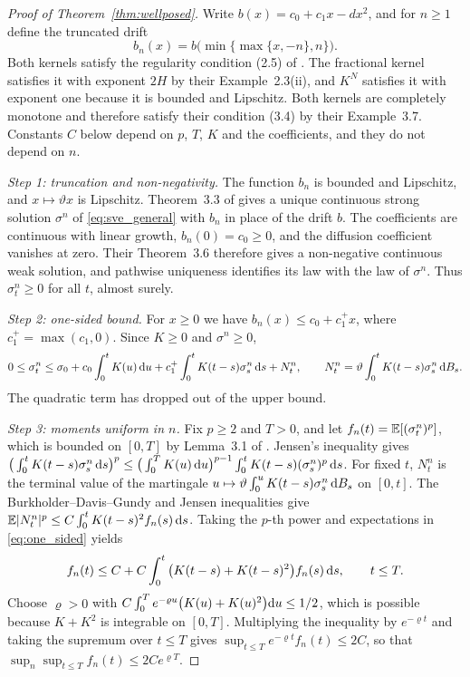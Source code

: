 \begin{proof}[Proof of Theorem~\ref{thm:wellposed}] Write $b(x)=c_0+c_1x-dx^2$, and for $n\ge1$ define the truncated drift
\begin{equation*}
b_n(x)=b\big(\min\{\max\{x,-n\},n\}\big).
\end{equation*}
Both kernels satisfy the regularity condition (2.5) of \citet{AbiJaberLarssonPulido2019}. The fractional kernel satisfies it with exponent $2H$ by their Example~2.3(ii), and $K^N$ satisfies it with exponent one because it is bounded and Lipschitz. Both kernels are completely monotone and therefore satisfy their condition (3.4) by their Example~3.7. Constants $C$ below depend on $p$, $T$, $K$ and the coefficients, and they do not depend on $n$.

\emph{Step 1: truncation and non-negativity.} The function $b_n$ is bounded and Lipschitz, and $x\mapsto\vartheta x$ is Lipschitz. Theorem~3.3 of \citet{AbiJaberLarssonPulido2019} gives a unique continuous strong solution $\sigma^n$ of \eqref{eq:sve_general} with $b_n$ in place of the drift $b$. The coefficients are continuous with linear growth, $b_n(0)=c_0\ge0$, and the diffusion coefficient vanishes at zero. Their Theorem~3.6 therefore gives a non-negative continuous weak solution, and pathwise uniqueness identifies its law with the law of $\sigma^n$. Thus $\sigma^n_t\ge0$ for all $t$, almost surely.

\emph{Step 2: one-sided bound.} For $x\ge0$ we have $b_n(x)\le c_0+c_1^+x$, where $c_1^+=\max(c_1,0)$. Since $K\ge0$ and $\sigma^n\ge0$,
\begin{equation}\label{eq:one_sided}
0\le\sigma^n_t\le\sigma_0+c_0\int_0^tK(u)\,\D u+c_1^+\int_0^tK(t-s)\sigma^n_s\,\D s+N^n_t,\qquad N^n_t=\vartheta\int_0^tK(t-s)\sigma^n_s\,\D B_s .
\end{equation}
The quadratic term has dropped out of the upper bound.

\emph{Step 3: moments uniform in $n$.} Fix $p\ge2$ and $T>0$, and let $f_n(t)=\mathbb{E}[(\sigma^n_t)^p]$, which is bounded on $[0,T]$ by Lemma~3.1 of \citet{AbiJaberLarssonPulido2019}. Jensen's inequality gives $\big(\int_0^tK(t-s)\sigma^n_s\,\mathrm{d} s\big)^p\le\big(\int_0^TK(u)\,\mathrm{d} u\big)^{p-1}\int_0^tK(t-s)(\sigma^n_s)^p\,\mathrm{d} s$. For fixed $t$, $N^n_t$ is the terminal value of the martingale $u\mapsto\vartheta\int_0^uK(t-s)\sigma^n_s\,\mathrm{d} B_s$ on $[0,t]$. The Burkholder--Davis--Gundy and Jensen inequalities give $\mathbb{E}|N^n_t|^p\le C\int_0^tK(t-s)^2f_n(s)\,\mathrm{d} s$. Taking the $p$-th power and expectations in \eqref{eq:one_sided} yields
\begin{equation*}
f_n(t)\le C+C\int_0^t\big(K(t-s)+K(t-s)^2\big)f_n(s)\,\mathrm{d} s,\qquad t\le T .
\end{equation*}
Choose $\varrho>0$ with $C\int_0^Te^{-\varrho u}\big(K(u)+K(u)^2\big)\mathrm{d} u\le1/2$, which is possible because $K+K^2$ is integrable on $[0,T]$. Multiplying the inequality by $e^{-\varrho t}$ and taking the supremum over $t\le T$ gives $\sup_{t\le T}e^{-\varrho t}f_n(t)\le2C$, so that $\sup_n\sup_{t\le T}f_n(t)\le2Ce^{\varrho T}$.


\end{proof}
